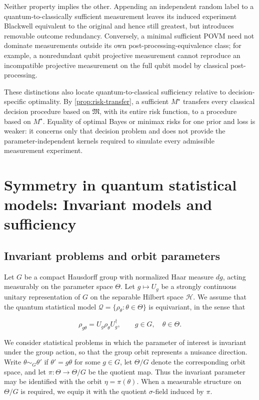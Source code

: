 \documentclass{article}
\theoremstyle{named}
\theoremstyle{named1}
\newcommand{\cQ}{\mathcal Q}
\newcommand{\cH}{\mathcal H}
\theoremstyle{plain}
\theoremstyle{remark}
\begin{document}
Neither property implies the other. Appending an independent random label
to a quantum-to-classically sufficient measurement leaves its induced
experiment Blackwell equivalent to the original and hence still greatest,
but introduces removable outcome redundancy. Conversely, a minimal
sufficient POVM need not dominate measurements outside its own
post-processing-equivalence class; for example, a nonredundant qubit
projective measurement cannot reproduce an incompatible projective
measurement on the full qubit model by classical post-processing.

These distinctions also locate quantum-to-classical sufficiency relative
to decision-specific optimality. By \cref{prop:risk-transfer}, a sufficient
$M^\star$ transfers every classical decision procedure based on
$\mathfrak M$, with its entire risk function, to a procedure based on
$M^\star$. Equality of optimal Bayes or minimax risks for one prior and loss
is weaker: it concerns only that decision problem and does not provide the
parameter-independent kernels required to simulate every admissible
measurement experiment.





\section{Symmetry in quantum statistical models: Invariant models and sufficiency}
\label{sec:symmetry}


\subsection{Invariant problems and orbit parameters}
\label{sec:invariant-problems}

Let \(G\) be a compact Hausdorff group with normalized Haar measure \(dg\), acting measurably on the parameter space \(\Theta\). Let \(g\mapsto U_g\) be a strongly continuous unitary representation of \(G\) on the separable Hilbert space \(\cH\). We assume that the quantum statistical model \(\cQ=\{\rho_\theta:\theta\in\Theta\}\) is equivariant, in the sense that

$$
    \rho_{g\theta}=U_g\rho_\theta U_g^\dagger,
    \qquad g\in G,\quad \theta\in\Theta.
$$

We consider statistical problems in which the parameter of interest is invariant under the group action, so that the group orbit represents a nuisance direction. Write \(\theta\sim_G\theta'\) if \(\theta'=g\theta\) for some \(g\in G\), let \(\Theta/G\) denote the corresponding orbit space, and let \(\pi:\Theta\to\Theta/G\) be the quotient map. Thus the invariant parameter may be identified with the orbit \(\eta=\pi(\theta)\). When a measurable structure on \(\Theta/G\) is required, we equip it with the quotient \(\sigma\)-field induced by \(\pi\).
\end{document}
